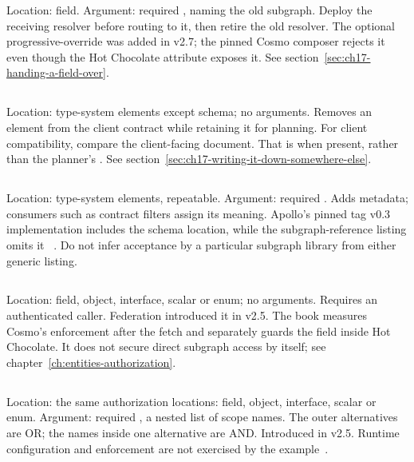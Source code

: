 Location: field. Argument: required , naming the old subgraph.
Deploy the receiving resolver before routing to it, then retire the old
resolver. The optional progressive-override  was added in v2.7;
the pinned Cosmo composer rejects it even though the Hot Chocolate attribute
exposes it. See section~\ref{sec:ch17-handing-a-field-over}.

\subsection*{}

Location: type-system elements except schema; no arguments.
Removes an element from the client contract while retaining it for planning.
For client compatibility, compare the client-facing document.
That is  when present, rather than the
planner's .
See section~\ref{sec:ch17-writing-it-down-somewhere-else}.

\subsection*{}

Location: type-system elements, repeatable. Argument: required .
Adds metadata; consumers such as contract filters assign its meaning.
Apollo's pinned tag v0.3 implementation includes the schema location, while
the subgraph-reference listing omits it
~\autocite{apollotag26repair}. Do not infer acceptance by a particular
subgraph library from either generic listing.

\subsection*{}

Location: field, object, interface, scalar or enum; no arguments.
Requires an authenticated caller. Federation introduced it in v2.5.
The book measures Cosmo's enforcement after the fetch and separately guards
the field inside Hot Chocolate. It does not secure direct subgraph access
by itself; see chapter~\ref{ch:entities-authorization}.

\subsection*{}

Location: the same authorization locations: field, object, interface, scalar
or enum. Argument: required , a nested list of scope names.
The outer alternatives are OR; the names inside one alternative are AND.
Introduced in v2.5. Runtime configuration and enforcement are not exercised
by the example~\autocite{apolloscopes26repair}.

